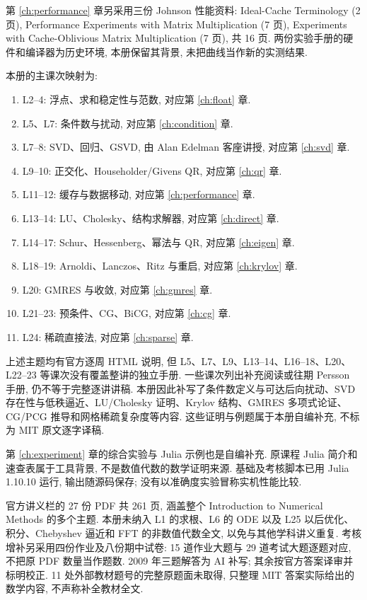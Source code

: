 第 \ref{ch:performance} 章另采用三份 Johnson 性能资料: Ideal-Cache Terminology (2 页), Performance Experiments with Matrix Multiplication (7 页), Experiments with Cache-Oblivious Matrix Multiplication (7 页), 共 16 页. 两份实验手册的硬件和编译器为历史环境, 本册保留其背景, 未把曲线当作新的实测结果.

本册的主课次映射为:
\begin{enumerate}
\item L2--4: 浮点、求和稳定性与范数, 对应第 \ref{ch:float} 章.
\item L5、L7: 条件数与扰动, 对应第 \ref{ch:condition} 章.
\item L7--8: SVD、回归、GSVD, 由 Alan Edelman 客座讲授, 对应第 \ref{ch:svd} 章.
\item L9--10: 正交化、Householder/Givens QR, 对应第 \ref{ch:qr} 章.
\item L11--12: 缓存与数据移动, 对应第 \ref{ch:performance} 章.
\item L13--14: LU、Cholesky、结构求解器, 对应第 \ref{ch:direct} 章.
\item L14--17: Schur、Hessenberg、幂法与 QR, 对应第 \ref{ch:eigen} 章.
\item L18--19: Arnoldi、Lanczos、Ritz 与重启, 对应第 \ref{ch:krylov} 章.
\item L20: GMRES 与收敛, 对应第 \ref{ch:gmres} 章.
\item L21--23: 预条件、CG、BiCG, 对应第 \ref{ch:cg} 章.
\item L24: 稀疏直接法, 对应第 \ref{ch:sparse} 章.
\end{enumerate}
上述主题均有官方逐周 HTML 说明, 但 L5、L7、L9、L13--14、L16--18、L20、L22--23 等课次没有覆盖整讲的独立手册. 一些课次列出补充阅读或往期 Persson 手册, 仍不等于完整逐讲讲稿. 本册因此补写了条件数定义与可达后向扰动、SVD 存在性与低秩逼近、LU/Cholesky 证明、Krylov 结构、GMRES 多项式论证、CG/PCG 推导和网格稀疏复杂度等内容. 这些证明与例题属于本册自编补充, 不标为 MIT 原文逐字译稿.

第 \ref{ch:experiment} 章的综合实验与 Julia 示例也是自编补充. 原课程 Julia 简介和速查表属于工具背景, 不是数值代数的数学证明来源. 基础及考核脚本已用 Julia 1.10.10 运行, 输出随源码保存; 没有以准确度实验冒称实机性能比较.

官方讲义栏的 27 份 PDF 共 261 页, 涵盖整个 Introduction to Numerical Methods 的多个主题. 本册未纳入 L1 的求根、L6 的 ODE 以及 L25 以后优化、积分、Chebyshev 逼近和 FFT 的非数值代数全文, 以免与其他学科讲义重复. 考核增补另采用四份作业及八份期中试卷: 15 道作业大题与 29 道考试大题逐题对应, 不把原 PDF 数量当作题数. 2009 年三题解答为 AI 补写; 其余按官方答案译审并标明校正. 11 处外部教材题号的完整原题面未取得, 只整理 MIT 答案实际给出的数学内容, 不声称补全教材全文.

